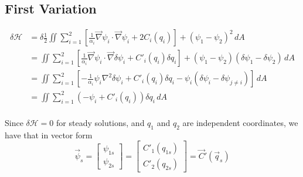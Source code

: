 \documentclass[12pt]{article}
\begin{document}
  \subsection{First Variation}
    \begin{align*}
      \delta \mathcal{H} &= \delta \frac12 \iint \sum_{i=1}^2 \left[ \frac{1}{\alpha_i} \vec\nabla \psi_i \cdot \vec\nabla \psi_i + 2C_i(q_i) \right]+ (\psi_1 - \psi_2)^2 \, dA \\
       &= \iint \sum_{i=1}^2 \left[ \frac{1}{\alpha_i} \vec\nabla \psi_i \cdot \vec\nabla \delta\psi_i + C'_i(q_i) \delta q_i \right]+ (\psi_1 - \psi_2)(\delta \psi_1 - \delta \psi_2) \, dA \\
       &= \iint \sum_{i=1}^2 \left[ -\frac{1}{\alpha_i} \psi_i \nabla^2 \delta\psi_i + C'_i(q_i) \delta q_i - \psi_i(\delta \psi_i - \delta \psi_{j \ne i}) \right] \, dA \\
       &= \iint \sum_{i=1}^2 (-\psi_i + C'_i(q_i)) \delta q_i\, dA \\
    \end{align*}

    Since $\delta \mathcal{H} = 0$ for steady solutions, and $q_1$ and $q_2$ are independent coordinates, we have that in vector form
    \begin{equation}
      \vec \psi_s = 
      \left[\begin{array}{c}
        \psi_{1s} \\
        \psi_{2s}
      \end{array}\right]
      =
      \left[\begin{array}{c}
        C'_1(q_{1s}) \\
        C'_2(q_{2s})
      \end{array}\right]
      =
      \vec C'(\vec q_s)
    \end{equation}

\end{document}
